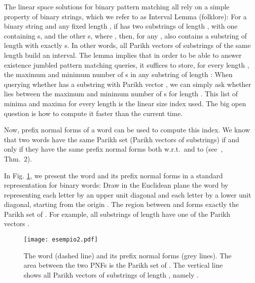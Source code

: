 \documentclass[11pt,a4paper]{llncs}
\renewcommand{\epsilon}{\varepsilon}
\begin{document}
\newcommand{\fmax}{F}
\newcommand{\subword}{\sqsubseteq}
\def\pequiv{\sim_P}
\newcommand{\pmax}{\mathop{\rm pmax}}
\newcommand{\pmin}{\mathop{\rm pmin}}
\newcommand{\fmin}{f}
\newcommand{\M}{{\textrm M}}
\renewcommand{\epsilon}{\varepsilon}
\def\P{p}



The linear space solutions for binary pattern matching all rely on a simple property of binary strings, which we refer to as Interval Lemma (folklore): For a binary string  and any fixed length , if  has two substrings of length , with one containing  s, and the other  s, where , then, for any ,  also contains a substring of length  with exactly  s. In other words, all Parikh vectors of substrings of the same length build an interval. The lemma implies that in order to be able to answer existence jumbled pattern matching queries, it suffices to store, for every length , the maximum and minimum number of s in any substring of length :  When querying whether  has a substring with Parikh vector , we can simply ask whether  lies between the maximum and minimum number of s for length . This list of minima and maxima for every length is the linear size index used. The big open question is how to compute it faster than the current  time. 

Now, prefix normal forms of a word  can be used to compute this index. We know that two words have the same Parikh set (Parikh vectors of substrings) if and only if they have the same prefix normal forms both w.r.t.\  and to  (see~\cite{FL11}, Thm.~2). 

In Fig. \ref{fig:esempio}, we present the word  and its prefix normal forms in a standard representation for binary words: Draw in the Euclidean plane the word  by representing each letter  by an upper unit diagonal and each letter  by a lower unit diagonal, starting from the origin . The region between  and  forms exactly the Parikh set of . For example, all substrings of length  have one of the Parikh vectors . 

\begin{figure}
\begin{minipage}{8cm}
\begin{center}
  \texttt{[image: esempio2.pdf]}
\end{center}
\end{minipage}
\begin{minipage}{6cm}
\end{minipage}
\begin{minipage}{7cm}
\begin{center}

\end{center}
\end{minipage}
\caption{The word  (dashed line) and its prefix normal forms (grey lines). The area between the two PNFs is the Parikh set of . The vertical line shows all Parikh vectors of substrings of length , namely .}\label{fig:esempio}
\end{figure}
\end{document}
